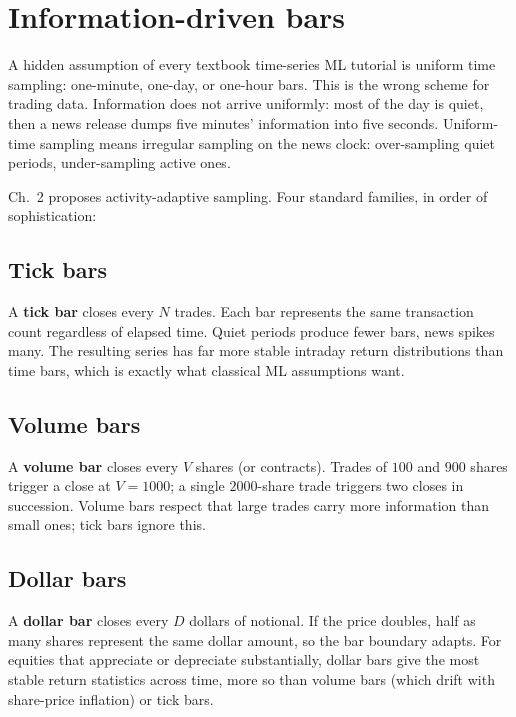 \section{Information-driven bars}
\label{sec:ml_bars}

A hidden assumption of every textbook time-series ML tutorial is
uniform time sampling: one-minute, one-day, or one-hour bars. This
is the wrong scheme for trading data. Information does not arrive
uniformly: most of the day is quiet, then a news release dumps
five minutes' information into five seconds. Uniform-time sampling
means irregular sampling on the news clock: over-sampling quiet
periods, under-sampling active ones.

\citeAFML{} Ch.~2 proposes activity-adaptive sampling. Four
standard families, in order of sophistication:

\subsection{Tick bars}
\label{subsec:ml_ticks}

A \textbf{tick bar} closes every $N$ trades. Each bar represents
the same transaction count regardless of elapsed time. Quiet
periods produce fewer bars, news spikes many. The resulting series
has far more stable intraday return distributions than time bars,
which is exactly what classical ML assumptions want.

\subsection{Volume bars}
\label{subsec:ml_volume}

A \textbf{volume bar} closes every $V$ shares (or contracts).
Trades of $100$ and $900$ shares trigger a close at $V = 1000$;
a single $2000$-share trade triggers two closes in succession.
Volume bars respect that large trades carry more information than
small ones; tick bars ignore this.

\subsection{Dollar bars}
\label{subsec:ml_dollar}

A \textbf{dollar bar} closes every $D$ dollars of notional. If
the price doubles, half as many shares represent the same
dollar amount, so the bar boundary adapts. For equities that
appreciate or depreciate substantially, dollar bars give the
most stable return statistics across time, more so than
volume bars (which drift with share-price inflation) or tick
bars.

